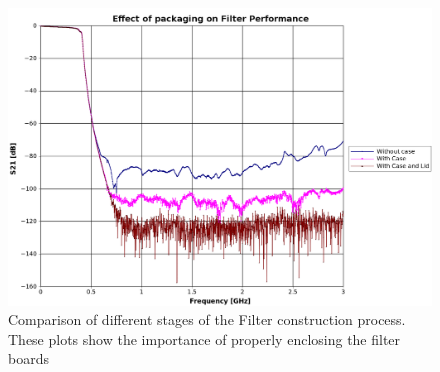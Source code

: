 \begin{figure}
 \centering
 \includegraphics[width=\textwidth]{./images/LowFrequencyFilters/filterBoxing.png}
 \caption{Comparison of different stages of the Filter construction process. These plots show the importance of properly enclosing the filter boards}
 \label{fig:filterBoxing}
\end{figure}


